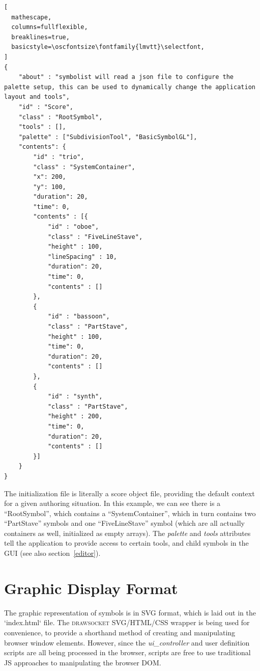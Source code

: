 \documentclass{article}
\def\drawsocket{\textsc{drawsocket}\xspace}
\def\oscfontsize{\footnotesize}
\begin{document}
\begin{lstlisting}[
  mathescape,
  columns=fullflexible,
  breaklines=true,
  basicstyle=\oscfontsize\fontfamily{lmvtt}\selectfont,
]
{
    "about" : "symbolist will read a json file to configure the palette setup, this can be used to dynamically change the application layout and tools",
    "id" : "Score",
    "class" : "RootSymbol",
    "tools" : [],
    "palette" : ["SubdivisionTool", "BasicSymbolGL"],
    "contents": { 
        "id" : "trio",
        "class" : "SystemContainer",
        "x": 200,
        "y": 100,
        "duration": 20,
        "time": 0,
        "contents" : [{
            "id" : "oboe",
            "class" : "FiveLineStave",
            "height" : 100,
            "lineSpacing" : 10,
            "duration": 20,
            "time": 0,
            "contents" : []
        },
        {
            "id" : "bassoon",
            "class" : "PartStave",
            "height" : 100,
            "time": 0,
            "duration": 20,
            "contents" : []
        },
        {
            "id" : "synth",
            "class" : "PartStave",
            "height" : 200,
            "time": 0,
            "duration": 20,
            "contents" : []
        }]
    }
}
\end{lstlisting}

The initialization file is literally a score object file, providing the default context for a given authoring situation. In this example, we can see there is a ``RootSymbol'', which contains a ``SystemContainer'', which in turn contains two ``PartStave'' symbols and one ``FiveLineStave'' symbol (which are all actually containers as well, initialized as empty arrays). The \textit{palette} and \textit{tools} attributes tell the application to provide access to certain tools, and child symbols in the GUI (see also section~\ref{editor}).

\section{Graphic Display Format}\label{subsec:file_format}

The graphic representation of symbols is in SVG format, which is laid out in the `index.html` file. The \drawsocket SVG/HTML/CSS wrapper is being used for convenience, to provide a shorthand method of creating and manipulating browser window elements. However, since the \textit{ui\_controller} and user definition scripts are all being processed in the browser, scripts are free to use traditional JS approaches to manipulating the browser DOM.
\end{document}
